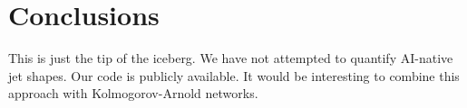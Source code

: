 \section{Conclusions}\label{sec:conclusions}

This is just the tip of the iceberg. We have not attempted to quantify
AI-native jet shapes. Our code is publicly available. It would be
interesting to combine this approach with Kolmogorov-Arnold networks.

